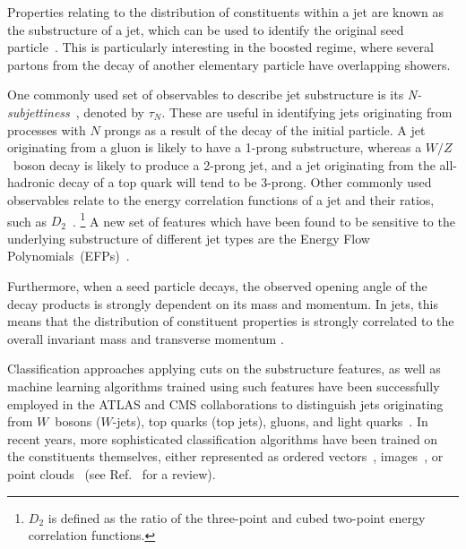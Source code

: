 Properties relating to the distribution of constituents within a jet are known as the substructure of a jet, which can be used to identify the original seed particle~\cite{Kogler:2018hem}.
This is particularly interesting in the boosted regime, where several partons from the decay of another elementary particle have overlapping showers.

One commonly used set of observables to describe jet substructure is its \emph{N-subjettiness}~\cite{Thaler_2011}, denoted by ${\tau_N}$.
These are useful in identifying jets originating from processes with $N$ prongs as a result of the decay of the initial particle.
A jet originating from a gluon is likely to have a 1-prong substructure, whereas a $W/Z$~boson decay is likely to produce a 2-prong jet, and a jet originating from the all-hadronic decay of a top quark will tend to be 3-prong.
Other commonly used observables relate to the energy correlation functions of a jet and their ratios, such as $D_2$~\cite{Larkoski_2013,Larkoski_2014}.%
\footnote{$D_2$ is defined as the ratio of the three-point and cubed two-point energy correlation functions.}
A new set of features which have been found to be sensitive to the underlying substructure of different jet types are the Energy Flow Polynomials~(EFPs)~\cite{Komiske_2018}.

Furthermore, when a seed particle decays, the observed opening angle of the decay products is strongly dependent on its mass and momentum.
In jets, this means that the distribution of constituent properties is strongly correlated to the overall invariant mass and transverse momentum \pt.

Classification approaches applying cuts on the substructure features, as well as machine learning algorithms trained using such features have been successfully employed in the ATLAS and CMS collaborations to distinguish jets originating from $W$~bosons ($W$-jets), top quarks (top jets), gluons, and light quarks~\cite{ATLAS:2018wis,CMS:2020poo}.
In recent years, more sophisticated classification algorithms have been trained on the constituents themselves, either represented as ordered vectors~\cite{pearkes2017jet,ATLAS:2018wis,CMS:2020poo,Butter_2018}, images~\cite{de_Oliveira_2016,Kasieczka_2017,Macaluso_2018}, or point clouds~\cite{ParticleNet,Komiske:2018cqr,Moreno:2019bmu,Dreyer:2020brq,Dolan:2020qkr,Mikuni:2021pou,Shimmin:2021pkm,Gong:2022lye,Qu:2022mxj} (see Ref.~\cite{TopLandscape} for a review).

